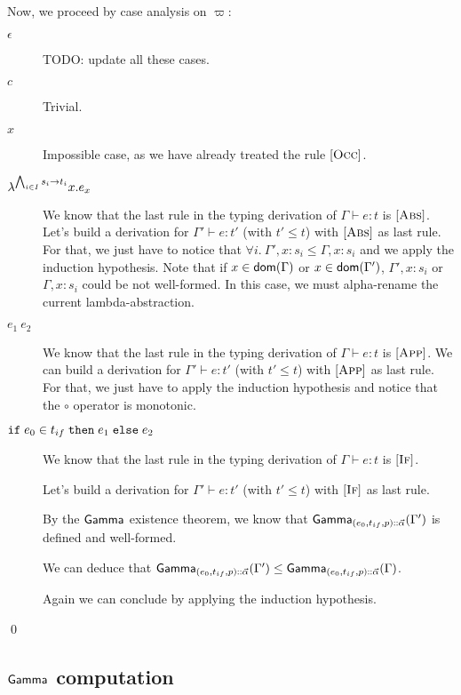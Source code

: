 \documentclass[a4paper]{article}
\theoremstyle{definition}
\begin{document}
      Now, we proceed by case analysis on $\varpi$:
      \begin{description}
        \item[$\epsilon$] TODO: update all these cases.
        \item[$c$] Trivial.
        \item[$x$] Impossible case, as we have already treated the rule $[\textsc{Occ}]$.
        \item[$\lambda^{\bigwedge_{i\in I} s_i\to t_i}x.e_x$] We know that the last rule in the typing derivation of $\Gamma \vdash e:t$ is $[\textsc{Abs}]$.
        Let's build a derivation for $\Gamma' \vdash e:t'$ (with $t'\leq t$) with $[\textsc{Abs}]$ as last rule.
        For that, we just have to notice that $\forall i.\ \Gamma',x:s_i \leq \Gamma,x:s_i$ and we apply the induction hypothesis.
        Note that if $x \in \textsf{dom}(\Gamma)$ or $x \in \textsf{dom}(\Gamma')$, $\Gamma',x:s_i$ or $\Gamma,x:s_i$ could be not well-formed.
        In this case, we must alpha-rename the current lambda-abstraction.

        \item[$e_1\ e_2$] We know that the last rule in the typing derivation of $\Gamma \vdash e:t$ is $[\textsc{App}]$.
        We can build a derivation for $\Gamma' \vdash e:t'$ (with $t'\leq t$) with $[\textsc{App}]$ as last rule.
        For that, we just have to apply the induction hypothesis and notice that the $\circ$ operator is monotonic.
        \item[$\texttt{if}\;e_0\in t_{if}\;\texttt{then}\;e_1\;\texttt{else}\;e_2$]
        We know that the last rule in the typing derivation of $\Gamma \vdash e:t$ is $[\textsc{If}]$.

        Let's build a derivation for $\Gamma' \vdash e:t'$ (with $t'\leq t$) with $[\textsc{If}]$ as last rule.

        By the $\textsf{Gamma}_{}$ existence theorem, we know that $\textsf{Gamma}_{{(e_0,t_{if},p)}\textsf{::}{\vec \alpha}}(\Gamma')$ is defined and well-formed.

        We can deduce that $\textsf{Gamma}_{{(e_0,t_{if},p)}\textsf{::}{\vec \alpha}}(\Gamma') \leq \textsf{Gamma}_{{(e_0,t_{if},p)}\textsf{::}{\vec \alpha}}(\Gamma)$.

        Again we can conclude by applying the induction hypothesis.\\
      \end{description}
    
      \qed

    \subsection{$\textsf{Gamma}_{}$ computation}
\end{document}
